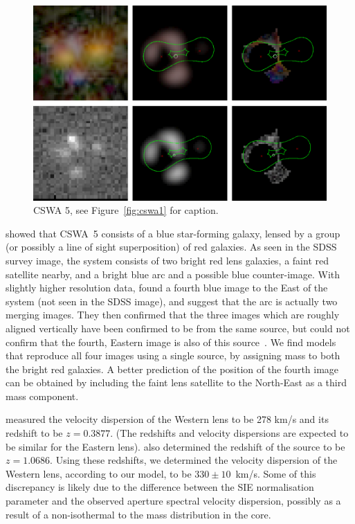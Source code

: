 \documentclass[iop]{emulateapj}
\begin{document}

\begin{figure}[!ht]
	\centering\includegraphics[width=\linewidth]{figs/5.eps}
	\caption{CSWA 5, see Figure~\ref{fig:cswa1} for caption.}
	\label{fig:cswa5}
\end{figure}

\citet{Bel++07} showed that CSWA~5 consists of a blue star-forming galaxy,
lensed by a group (or possibly a line of sight superposition)  of red galaxies.
As seen in the SDSS survey image, the  system consists of two bright red lens
galaxies, a faint red satellite nearby, and a bright blue arc and a possible
blue counter-image.   With slightly higher resolution data, \citet{Chr++10}
found  a fourth blue image to the East of the system (not seen in the SDSS
image), and suggest that the arc is actually two merging images.  They then
confirmed that the three images which are roughly aligned vertically have been
confirmed to be from the same source, but could not confirm that the fourth,
Eastern image is also of this source~\citep{Chr++10}. We find models that
reproduce all four images using a single source, by assigning mass to both the
bright red galaxies. A better prediction of the position of the  fourth image
can be obtained by including the faint lens satellite to the North-East as a
third mass component.

\citet{Chr++10} measured the velocity dispersion of the Western lens to be 278
km/s and its redshift to be $z = 0.3877$. (The redshifts and velocity
dispersions are expected to be similar for the Eastern lens).  \citet{Chr++10}
also determined the redshift of the source to be $z=1.0686$.  Using these
redshifts, we determined the velocity dispersion of the Western lens, according
to our model, to be $330\pm10$~km/s. Some of this discrepancy is likely due to
the difference between the SIE normalisation parameter and the observed
aperture spectral velocity dispersion, possibly as a result of a
non-isothermal to the mass distribution in the core.
\end{document}
